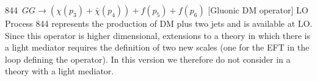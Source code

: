 844~$GG\to({\chi}(p_3)+\bar{\chi}(p_4)) +f(p_5)+f(p_6)$ [Gluonic DM operator]   LO\\

Process 844 represents the
production of DM plus two jets and is available at LO. Since this
operator is higher dimensional, extensions to a theory in which there
is a light mediator requires the definition of two new scales (one for
the EFT in the loop defining the operator). In this version we
therefore do not consider in a theory with a light mediator.
